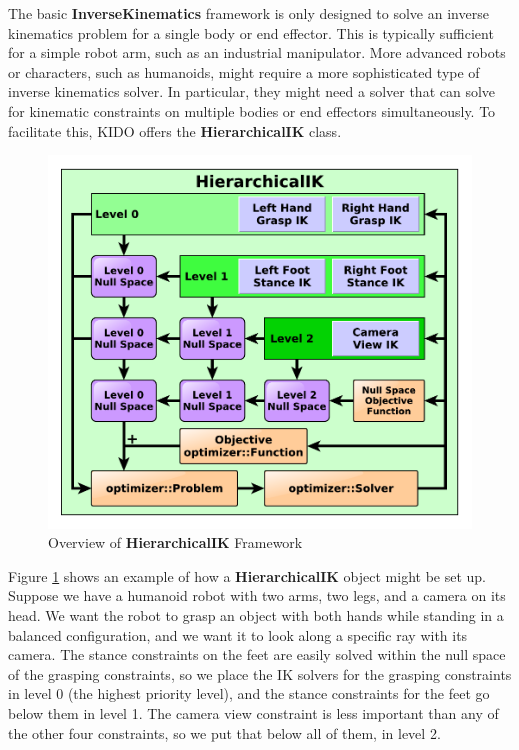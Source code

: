 The basic \textbf{InverseKinematics} framework is only designed to solve an inverse kinematics problem for a single body or end effector. This is typically sufficient for a simple robot arm, such as an industrial manipulator. More advanced robots or characters, such as humanoids, might require a more sophisticated type of inverse kinematics solver. In particular, they might need a solver that can solve for kinematic constraints on multiple bodies or end effectors simultaneously. To facilitate this, KIDO offers the \textbf{HierarchicalIK} class.

\begin{figure}
\centering
\includegraphics[width=\textwidth]{fig/hik_diagram.pdf}
\caption{Overview of \textbf{HierarchicalIK} Framework}
\label{fig:ik_hier_framework}
\end{figure}

Figure \ref{fig:ik_hier_framework} shows an example of how a \textbf{HierarchicalIK} object might be set up. Suppose we have a humanoid robot with two arms, two legs, and a camera on its head. We want the robot to grasp an object with both hands while standing in a balanced configuration, and we want it to look along a specific ray with its camera. The stance constraints on the feet are easily solved within the null space of the grasping constraints, so we place the IK solvers for the grasping constraints in level 0 (the highest priority level), and the stance constraints for the feet go below them in level 1. The camera view constraint is less important than any of the other four constraints, so we put that below all of them, in level 2.

